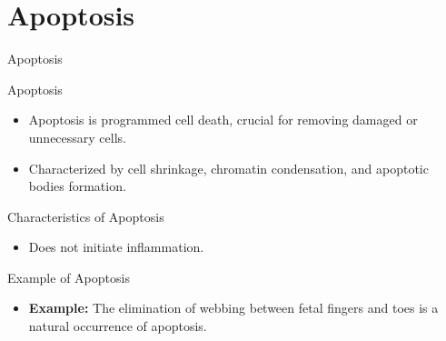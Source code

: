 \documentclass{beamer}
\begin{document}
	\section{Apoptosis}
	\begin{frame}{Apoptosis}
	\end{frame}
	\begin{frame}{Apoptosis}
		\begin{itemize}
			\item Apoptosis is programmed cell death, crucial for removing damaged or unnecessary cells.
			\item Characterized by cell shrinkage, chromatin condensation, and apoptotic bodies formation.
		\end{itemize}
	\end{frame}
	\begin{frame}{Characteristics of Apoptosis}
		\begin{itemize}
			\item Does not initiate inflammation.
		\end{itemize}
	\end{frame}
	\begin{frame}{Example of Apoptosis}
		\begin{itemize}
			\item \textbf{Example:} The elimination of webbing between fetal fingers and toes is a natural occurrence of apoptosis.
		\end{itemize}
	\end{frame}
	
\end{document}
